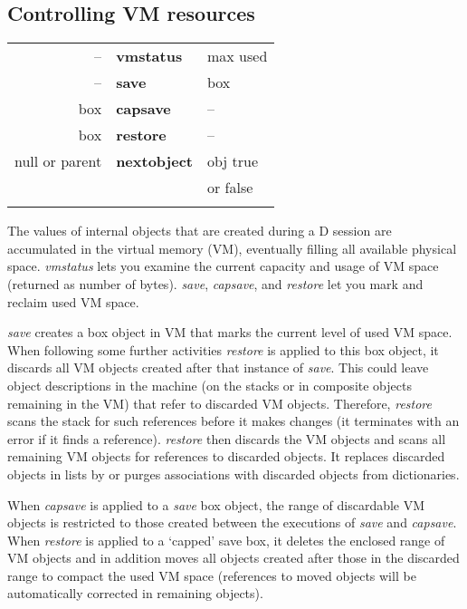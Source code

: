 \subsection{Controlling VM resources}

\begin{tabular}{>{\sffamily}r>{\sffamily\bfseries}l>{\sffamily}l}
-- & vmstatus & max used\\
-- & save & box\\
box & capsave & --\\
box & restore & --\\
null or parent & nextobject & obj true\\
            &            & or false\\\\
\end{tabular} 


The  values of internal objects that are created during a D  session  are accumulated  in  the  virtual memory (VM),  eventually  filling  all  available physical space. \emph{vmstatus} lets you examine the current capacity and usage of VM space (returned as number of bytes). \emph{save}, \emph{capsave}, and \emph{restore} let you mark and reclaim used VM space.

\emph{save} creates a box object in VM that marks the current level of
used VM space. When following some further activities \emph{restore}
is applied to this box object, it discards all VM objects created
after that instance of \emph{save}. This could leave object
descriptions in the machine (on the stacks or in composite objects
remaining in the VM) that refer to discarded VM objects. Therefore,
\emph{restore} scans the stack for such references before it makes
changes (it terminates with an error if it finds a
reference). \emph{restore} then discards the VM objects and scans all
remaining VM objects for references to discarded objects. It replaces
discarded objects in lists by  or purges associations with
discarded objects from dictionaries.

When \emph{capsave} is applied to a \emph{save} box object, the range of discardable VM objects is restricted to those created between the executions of \emph{save} and \emph{capsave}. When \emph{restore} is applied to a `capped' save box, it deletes the enclosed range of VM objects and in addition moves all objects created after those in the discarded range to compact the used VM space (references to moved objects will be automatically corrected in remaining objects).

